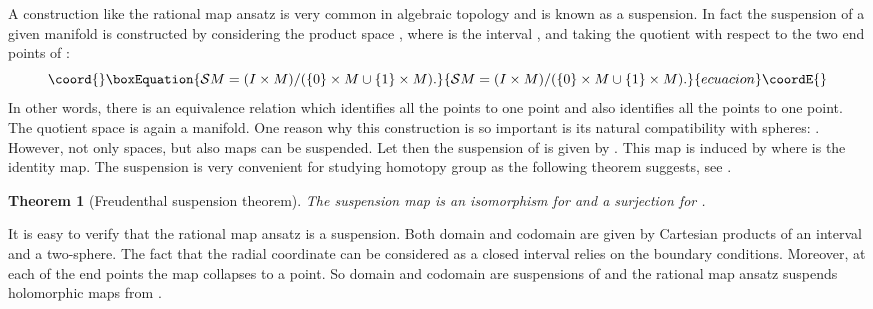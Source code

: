 \documentclass[a4paper,12pt]{article}
\newtheorem {theorem}{Theorem}[section]
\begin{document}
A construction like the rational map ansatz is very common in
algebraic topology and is known as a suspension. In fact the
suspension \coordHE{}  of a given manifold \coordHE{} is constructed by
considering the product space  \coordHE{}, where \coordHE{} is the interval
\coordHE{}, and taking the quotient with respect  to the two end points
of \coordHE{}: 
%
\begin{equation}\coord{}\boxEquation{
{\cal S} M = (I \times M) / (\{0\} \times M \cup \{1\} \times M).
}{
{\cal S} M = (I \times M) / (\{0\} \times M \cup \{1\} \times M).
}{ecuacion}\coordE{}\end{equation}
%
In other words, there is an equivalence relation \myHighlight{$\sim$}\coordHE{} which identifies 
all the points \coordHE{} to one point and also identifies all the 
points \coordHE{} to one point. 
The quotient space \coordHE{} is again a manifold.
One reason why this construction is so important is its 
natural compatibility with spheres:  \coordHE{}.  However, not
only spaces, but also maps can be suspended. Let \coordHE{} then the
suspension \coordHE{} of \coordHE{} is given by  \coordHE{}. This map is induced by \coordHE{} where \coordHE{} is the identity map.
The suspension is very convenient for studying homotopy 
group as the following theorem suggests, see 
\cite[Corollary 4.24]{Hatcher:2002}.
%
\begin{theorem}[Freudenthal suspension theorem]
\label{t:suspension}
The suspension map 
\linebreak[4]
\mbox{\coordHE{}} is an
isomorphism for \coordHE{} and a surjection for \coordHE{}. \hfill 
\myHighlight{$\square$}\coordHE{}
\end{theorem}

It is easy to verify that the rational map ansatz is a suspension. 
Both domain and codomain are given by Cartesian 
products of an interval and a two-sphere. The fact that the radial 
coordinate \myHighlight{$r \in [0,\infty)$}\coordHE{} can be considered as a closed interval 
relies on the boundary conditions. Moreover, at each of the end 
points the map collapses to a point. So domain and codomain are 
suspensions of \coordHE{} and the rational map ansatz suspends holomorphic maps 
from \coordHE{}.  
\end{document}
